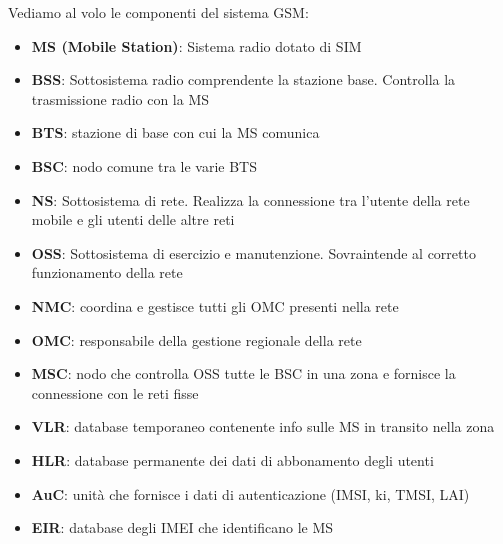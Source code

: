 Vediamo al volo le componenti del sistema GSM:
\begin{itemize}
    \item \textbf{MS (Mobile Station)}: Sistema radio dotato di SIM
    \item \textbf{BSS}: Sottosistema radio comprendente la stazione base. Controlla la trasmissione radio con la MS
    \item \textbf{BTS}: stazione di base con cui la MS comunica
    \item \textbf{BSC}: nodo comune tra le varie BTS
    \item \textbf{NS}: Sottosistema di rete. Realizza la connessione tra l’utente della rete mobile e gli utenti delle altre reti
    \item \textbf{OSS}: Sottosistema di esercizio e manutenzione. Sovraintende al corretto funzionamento della rete
    \item \textbf{NMC}: coordina e gestisce tutti gli OMC presenti nella rete
    \item \textbf{OMC}: responsabile della gestione regionale della rete
    \item \textbf{MSC}: nodo che controlla OSS tutte le BSC in una zona e fornisce la connessione con le reti fisse
    \item \textbf{VLR}: database temporaneo contenente info sulle MS in transito nella zona
    \item \textbf{HLR}: database permanente dei dati di abbonamento degli utenti
    \item \textbf{AuC}: unità che fornisce i dati di autenticazione (IMSI, ki, TMSI, LAI)
    \item \textbf{EIR}: database degli IMEI che identificano le MS
\end{itemize}

